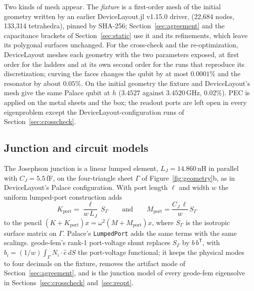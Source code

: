 \documentclass{anvil-paper}
\begin{document}
Two kinds of mesh appear. The \emph{fixture} is a first-order mesh of the
initial geometry written by an earlier DeviceLayout.jl v1.15.0 driver,
 (22{,}684 nodes,
133{,}314 tetrahedra), pinned by SHA-256;
Section~\ref{sec:agreement} and the capacitance brackets of
Section~\ref{sec:static} use it and its refinements, which leave its
polygonal surfaces unchanged. For the cross-check and the re-optimization,
DeviceLayout meshes each geometry with the two parameters exposed, at first
order for the ladders and at its own second order for the runs that
reproduce its discretization; curving the faces changes the qubit by at
most $0.0001\%$ and the resonator by about $0.05\%$. On the
initial geometry the fixture and DeviceLayout's mesh give the same Palace
qubit at $h$ ($3.4527$ against $3.4520$\,GHz, $0.02\%$). PEC is applied on
the metal sheets and the box; the readout ports are left open in every
eigenproblem except the DeviceLayout-configuration runs of
Section~\ref{sec:crosscheck}.

\subsection{Junction and circuit models}
\label{sec:junction}

The Josephson junction is a linear lumped element, $L_J = 14.860$\,nH in
parallel with $C_J = 5.5$\,fF, on the four-triangle sheet $\Gamma$ of
Figure~\ref{fig:geometry}b, as in DeviceLayout's Palace configuration. With
port length $\ell$ and width $w$ the uniform lumped-port construction adds
\begin{equation}
  K_{\mathrm{port}} = \frac{\ell}{w\,L_J}\, S_\Gamma
  \qquad\text{and}\qquad
  M_{\mathrm{port}} = \frac{C_J\,\ell}{w}\, S_\Gamma
  \label{eq:port}
\end{equation}
to the pencil $(K + K_{\mathrm{port}})x = \omega^2(M + M_{\mathrm{port}})x$,
where $S_\Gamma$ is the isotropic surface matrix on $\Gamma$. Palace's
\texttt{LumpedPort} adds the same terms with the same scalings. geode-fem's
rank-1 port-voltage shunt replaces $S_\Gamma$ by $b\,b^{\mathsf T}$, with
$b_i = (1/w)\int_\Gamma N_i\cdot\hat e\,dS$ the port-voltage functional; it
keeps the physical modes to four decimals on the fixture, removes the
artifact mode of Section~\ref{sec:agreement}, and is the junction model of
every geode-fem eigensolve in Sections~\ref{sec:crosscheck}
and~\ref{sec:reopt}.
\end{document}
